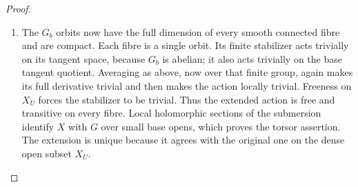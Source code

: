 \begin{proof}
\begin{enumerate}[label={$\langle1\rangle$\arabic*.},leftmargin=*]
\item The $G_b$ orbits now have the full dimension of every smooth
connected fibre and are compact.  Each fibre is a single
orbit.  Its finite stabilizer acts trivially on its tangent
space, because $G_b$ is abelian; it also acts trivially on
the base tangent quotient.  Averaging as above, now over
that finite group, again makes its full derivative trivial
and then makes the action locally trivial.  Freeness on
$X_U$ forces the stabilizer to be trivial.  Thus the extended
action is free and transitive on every fibre.  Local
holomorphic sections of the submersion identify $X$ with
$G$ over small base opens, which proves the torsor assertion.
The extension is unique because it agrees with the original
one on the dense open subset $X_U$.

\end{enumerate}
\end{proof}
